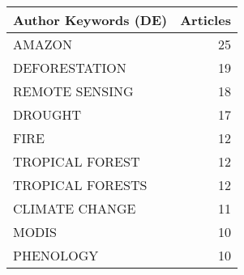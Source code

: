 
\begin{tabular}{lr}
\toprule
Author Keywords (DE) & Articles\\
\midrule
AMAZON & 25\\
DEFORESTATION & 19\\
REMOTE SENSING & 18\\
DROUGHT & 17\\
FIRE & 12\\
\addlinespace
TROPICAL FOREST & 12\\
TROPICAL FORESTS & 12\\
CLIMATE CHANGE & 11\\
MODIS & 10\\
PHENOLOGY & 10\\
\bottomrule
\end{tabular}